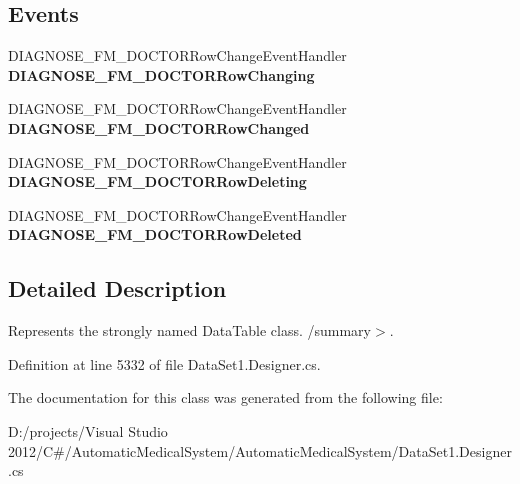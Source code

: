 \subsection*{Events}
\begin{CompactItemize}
\item 
DIAGNOSE\_\-FM\_\-DOCTORRowChangeEventHandler \textbf{DIAGNOSE\_\-FM\_\-DOCTORRowChanging}\label{class_automatic_medical_system_1_1_data_set1_1_1_d_i_a_g_n_o_s_e___f_m___d_o_c_t_o_r_data_table_b4ce1797484873d841895c0740102e07}

\item 
DIAGNOSE\_\-FM\_\-DOCTORRowChangeEventHandler \textbf{DIAGNOSE\_\-FM\_\-DOCTORRowChanged}\label{class_automatic_medical_system_1_1_data_set1_1_1_d_i_a_g_n_o_s_e___f_m___d_o_c_t_o_r_data_table_bc6d876377809dfccca6ca1d66015f75}

\item 
DIAGNOSE\_\-FM\_\-DOCTORRowChangeEventHandler \textbf{DIAGNOSE\_\-FM\_\-DOCTORRowDeleting}\label{class_automatic_medical_system_1_1_data_set1_1_1_d_i_a_g_n_o_s_e___f_m___d_o_c_t_o_r_data_table_365cdc88874f0bdbd0dcd2d9fa49df77}

\item 
DIAGNOSE\_\-FM\_\-DOCTORRowChangeEventHandler \textbf{DIAGNOSE\_\-FM\_\-DOCTORRowDeleted}\label{class_automatic_medical_system_1_1_data_set1_1_1_d_i_a_g_n_o_s_e___f_m___d_o_c_t_o_r_data_table_a60bbcf46e8613616f5cc396c7fcc4c2}

\end{CompactItemize}


\subsection{Detailed Description}
Represents the strongly named DataTable class. /summary$>$. 

Definition at line 5332 of file DataSet1.Designer.cs.

The documentation for this class was generated from the following file:\begin{CompactItemize}
\item 
D:/projects/Visual Studio 2012/C\#/AutomaticMedicalSystem/AutomaticMedicalSystem/DataSet1.Designer.cs\end{CompactItemize}
